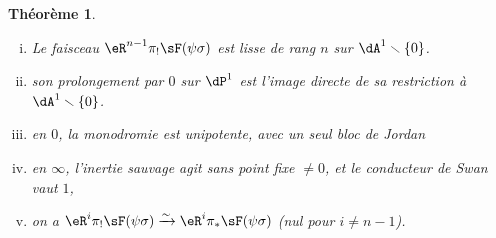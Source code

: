 \documentclass[oneside]{book}
\newcommand{\iso}{\xrightarrow\sim}
\renewcommand{\setminus}{\smallsetminus}
\theoremstyle{sga-source}
\theoremstyle{sga-source-dash}
\theoremstyle{sga-source-dotdash}
\theoremstyle{sga-source-number-note-dash}
\theoremstyle{sga-source-note-number-dotdash}
\theoremstyle{sga-source-example-dotdash}
\theoremstyle{sga-source-inline-number}
\theoremstyle{sga-source-bare-number}
\theoremstyle{sga-source}
\newtheorem{theorem_}[subsection]{Théorème}
\newcommand{\PrintPage}[1]{}\newcommand{\MathPage}[1]{}\newcommand{\PrintCite}[2]{#1}\newcommand{\var}[3]{#2}
\begin{document}
\begin{theorem_}\label{VI:7-8}
\begin{enumerate}[(i)]
  \item Le faisceau $\eR^{n-1}\pi_! \sF(\psi\sigma)$ est lisse de rang $n$ sur 
    $\dA^1\setminus \{0\}$. 
  \item son prolongement par $0$ sur $\dP^1$ est l'image directe de sa 
    restriction à $\dA^1\setminus \{0\}$. 
  \PrintPage{222}
\item en $0$, la monodromie est unipotente, avec un seul bloc de Jordan
  \item en $\infty$, l'inertie sauvage agit sans point fixe $\ne 0$, et le 
    conducteur de Swan vaut $1$, 
  \item on a $\eR^i \pi_! \sF(\psi\sigma) \iso \eR^i \pi_\ast \sF(\psi\sigma)$ 
    (nul pour $i\ne n-1$).
\end{enumerate}
\end{theorem_}
\end{document}
